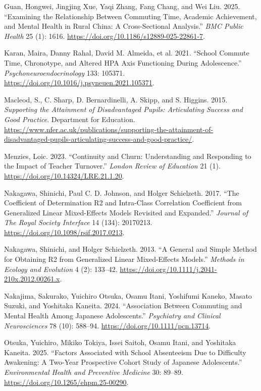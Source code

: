 \documentclass[
  12pt,
  titlepage]{article}
\newlength{\cslhangindent}
\newenvironment{CSLReferences}[2] %
 {\begin{list}{}{%
  \setlength{\itemindent}{0pt}
  \setlength{\leftmargin}{0pt}
  \setlength{\parsep}{0pt}
  \ifodd #1
   \setlength{\leftmargin}{\cslhangindent}
   \setlength{\itemindent}{-1\cslhangindent}
  \fi
  \setlength{\itemsep}{#2\baselineskip}}}
 {\end{list}}
\begin{document}
\begin{CSLReferences}{1}{1}
Guan, Hongwei, Jingjing Xue, Yaqi Zhang, Fang Chang, and Wei Liu. 2025.
{``Examining the Relationship Between Commuting Time, Academic
Achievement, and Mental Health in Rural {China}: A Cross-Sectional
Analysis.''} \emph{BMC Public Health} 25 (1): 1616.
\url{https://doi.org/10.1186/s12889-025-22861-7}.

Karan, Maira, Danny Rahal, David M. Almeida, et al. 2021. {``School
Commute Time, Chronotype, and Altered {HPA} Axis Functioning During
Adolescence.''} \emph{Psychoneuroendocrinology} 133: 105371.
\url{https://doi.org/10.1016/j.psyneuen.2021.105371}.

Macleod, S., C. Sharp, D. Bernardinelli, A. Skipp, and S. Higgins. 2015.
\emph{Supporting the {Attainment} of {Disadvantaged} {Pupils}:
{Articulating} {Success} and {Good} {Practice}}. Department for
Education.
\url{https://www.nfer.ac.uk/publications/supporting-the-attainment-of-disadvantaged-pupils-articulating-success-and-good-practice/}.

Menzies, Loic. 2023. {``Continuity and Churn: Understanding and
Responding to the Impact of Teacher Turnover.''} \emph{London Review of
Education} 21 (1). \url{https://doi.org/10.14324/LRE.21.1.20}.

Nakagawa, Shinichi, Paul C. D. Johnson, and Holger Schielzeth. 2017.
{``The Coefficient of Determination {R2} and Intra-Class Correlation
Coefficient from Generalized Linear Mixed-Effects Models Revisited and
Expanded.''} \emph{Journal of The Royal Society Interface} 14 (134):
20170213. \url{https://doi.org/10.1098/rsif.2017.0213}.

Nakagawa, Shinichi, and Holger Schielzeth. 2013. {``A General and Simple
Method for Obtaining {R2} from Generalized Linear Mixed-Effects
Models.''} \emph{Methods in Ecology and Evolution} 4 (2): 133--42.
\url{https://doi.org/10.1111/j.2041-210x.2012.00261.x}.

Nakajima, Sakurako, Yuichiro Otsuka, Osamu Itani, Yoshifumi Kaneko,
Masato Suzuki, and Yoshitaka Kaneita. 2024. {``Association Between
Commuting and Mental Health Among {Japanese} Adolescents.''}
\emph{Psychiatry and Clinical Neurosciences} 78 (10): 588--94.
\url{https://doi.org/10.1111/pcn.13714}.

Otsuka, Yuichiro, Mikiko Tokiya, Issei Saitoh, Osamu Itani, and
Yoshitaka Kaneita. 2025. {``Factors Associated with School Absenteeism
Due to Difficulty Awakening: A Two-Year Prospective Cohort Study of
{Japanese} Adolescents.''} \emph{Environmental Health and Preventive
Medicine} 30: 89--89. \url{https://doi.org/10.1265/ehpm.25-00290}.


\end{CSLReferences}
\end{document}
